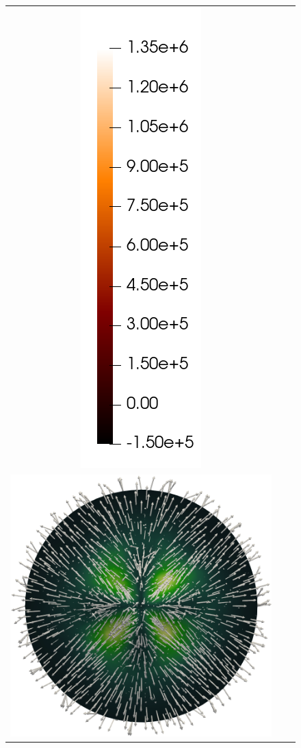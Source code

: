 \begin{figure}[H]
\begin{center}
\begin{tabular}[c]{c c c}
			\includegraphics[scale=.18]{pressureColorBar.png} \\
			\includegraphics[scale=.15]{recoveredVelocity_glyphs.png} &

\end{tabular}
\end{center}
\end{figure}
